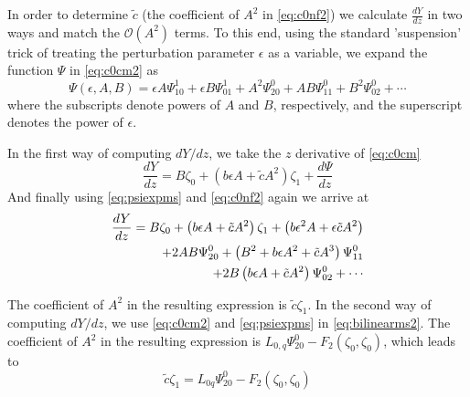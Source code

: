In order to determine $\tilde{c}$ (the coefficient of $A^2$ in \eqref{eq:c0nf2})
we calculate $\frac{dY}{dz}$ in two ways and match the $\mathcal{O}(A^2)$
terms.  To this end, using the standard 'suspension' trick of treating the
perturbation parameter $\epsilon$ as a variable, we expand the function $\Psi$
in \eqref{eq:c0cm2} as 
\begin{equation}\label{eq:psiexpms}
\Psi(\epsilon,A,B) = \epsilon A \Psi_{10}^1 + \epsilon B \Psi_{01}^1 + A^2 \Psi_{20}^0 + A B \Psi_{11}^0 + B^2 \Psi_{02}^0 + \cdots
\end{equation}
where the subscripts denote powers of $A$ and $B$, respectively, and the superscript denotes the power of $\epsilon$. 

In the first way of computing $dY/dz$, we take
the $z$ derivative of \eqref{eq:c0cm}
\begin{equation}
\frac{dY}{dz} = B \zeta_0 + \left(b \epsilon A + \tilde{c} A^2\right)\zeta_1 + \frac{d\Psi}{dz}
\end{equation}
And finally using \eqref{eq:psiexpms} and \eqref{eq:c0nf2} again we arrive at
\begin{align}
\frac{dY}{dz} = B \zeta_0 + \left(b \epsilon A + \tilde{c} A^2\right)\zeta_1 + \left( b \epsilon^2 A + \epsilon \tilde{c} A^2\right) \label{eq:longeqn1}\\
                + 2 A B\Psi_{20}^0 + \left( B^2 + b\epsilon A^2 + \tilde{c} A^3\right)\Psi_{11}^0 \notag \\ 
                + 2 B \left( b \epsilon A + \tilde{c} A^2 \right)\Psi_{02}^0 + \cdots \notag
\end{align}



The coefficient of $A^2$ in the resulting expression is $\tilde{c} \zeta_1 $. In the second way of computing $dY/dz$, we use \eqref{eq:c0cm2} and \eqref{eq:psiexpms} in \eqref{eq:bilinearms2}. The coefficient of $A^2$ in the resulting expression is 
$ L_{0,q} \Psi_{20}^0 - F_2\left(\zeta_0,\zeta_0\right)$,
which leads to 
\begin{equation}\label{eq:A2coef2}
 \tilde{c} \zeta_1 = L_{0q} \Psi_{20}^0 - F_2(\zeta_0,\zeta_0) \end{equation}

